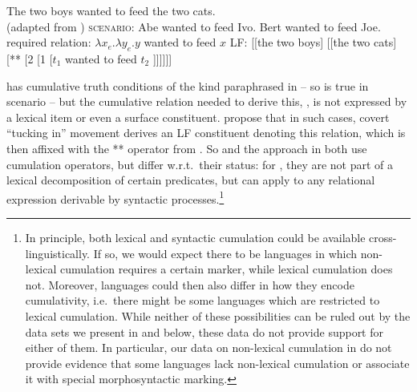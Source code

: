 \documentclass[output=paper]{langscibook}
\begin{document}
\ea\label{has-sch:7}
\ea\label{has-sch:7a} The two boys wanted to feed the two cats. \\  \hfill (adapted from \citealt{Beck:2000a}) \label{has-sch:3a}
\ex\label{has-sch:7b} \textsc{scenario:} Abe wanted to feed Ivo. Bert wanted to feed Joe. \label{has-sch:3b}
\ex\label{has-sch:7c} required relation: $\lambda x_{e}. \lambda y_{e}. y$ wanted to feed $x$
\ex\label{has-sch:7d} LF: [[the two boys] [[the two cats] [** [2 [1 [$t_{1}$ wanted to feed $t_{2}$ ]]]]]] \z\z

\noindent {} has cumulative truth conditions of the kind paraphrased in  --   so  is true in scenario  -- but the cumulative relation needed to derive this, , is not expressed by a lexical item or even a surface constituent. \citet{Beck:2000a} propose that in such cases, covert ``tucking in''  movement derives an LF constituent denoting this relation, which is then affixed with the ** operator from . So \citet{Beck:2000a} and the approach in  both use cumulation operators, but differ w.r.t.~their status: for \citet{Beck:2000a}, they are not part of a lexical decomposition of certain predicates, but can apply to any relational expression derivable by syntactic processes.\footnote{In principle, both lexical and syntactic cumulation could be available cross-linguistically. If so, we would expect there to be languages in which non-lexical cumulation requires a certain marker, while lexical cumulation does not. Moreover,
languages could then also differ in how they encode cumulativity, i.e.~there might be some languages which are restricted to lexical cumulation.  While neither of these possibilities can be  ruled out by the data sets we present in  and  below, these data do not provide support for either of them. In particular, our  data on non-lexical cumulation  in   do not provide evidence that some languages lack non-lexical cumulation or associate it with special morphosyntactic marking.}
\end{document}
